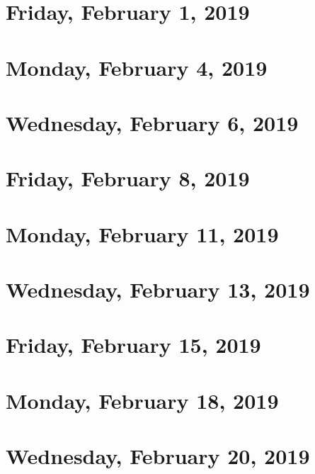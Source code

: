 \documentclass[reqno]{amsart}
\begin{document}
\section{Friday, February 1, 2019}
    

\section{Monday, February 4, 2019}
    
    
\section{Wednesday, February 6, 2019}
    

\section{Friday, February 8, 2019}
    
    
\section{Monday, February 11, 2019}
    
    
\section{Wednesday, February 13, 2019}
    

\section{Friday, February 15, 2019}
    

\section{Monday, February 18, 2019}
    
    
\section{Wednesday, February 20, 2019}
    
\end{document}
